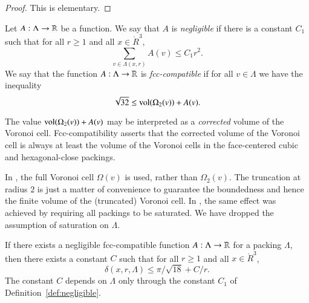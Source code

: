 \begin{proof}  This is elementary.
\end{proof}

\begin{definition}\label{def:negligible}
Let $A:\Lambda\to{\mathbb R}$ be a function.  We say that $A$
is
  {\it negligible\/}
if there is a constant $C_1$ such that for all $r\ge1$ and all
$x\in\ring{R}^3$,
   $$\sum_{v\in\Lambda(x,r)} A(v) \le C_1 r^2.$$
We say that the function $A:\Lambda\to{\mathbb R}$ is
  {\it fcc-compatible\/}
if for all $v\in\Lambda$ we have the inequality
$$\sqrt{32}\le {\operatorname{vol}}(\Omega_2(v)) + A(v).$$
\end{definition}





\begin{remark}
The value ${\operatorname{vol}}(\Omega_2(v)) + A(v)$ may be interpreted as a
{\it corrected\/} volume of the Voronoi
cell. Fcc-compatibility asserts that the corrected volume of the
Voronoi cell is always at least the volume of the Voronoi cells in
the face-centered cubic and hexagonal-close packings.
\end{remark}

\begin{remark} In \cite{DCG}, the full Voronoi cell $\Omega(v)$
is used, rather than $\Omega_2(v)$.  The truncation at radius $2$
is just a matter of convenience to guarantee the boundedness
and hence the finite volume of the (truncated) Voronoi cell.
In \cite{DCG}, the same effect was achieved by requiring all packings
to be saturated.  We have dropped the assumption of saturation
on $\Lambda$.
\end{remark}


\begin{lemma}
\label{lemma:deltabound} If there exists a 
negligible  fcc-compatible function
$A:\Lambda\to{\mathbb R}$ for a 
packing $\Lambda$, then there
exists a constant $C$ such that for all $r\ge1$ and all
$x\in\ring{R}^3$,
    $$
    \delta(x,r,\Lambda)
    \le \pi/\sqrt{18} + C/r.
    $$
The constant $C$ depends on $\Lambda$ only through the constant
$C_1$ of Definition~\ref{def:negligible}.
\end{lemma}



